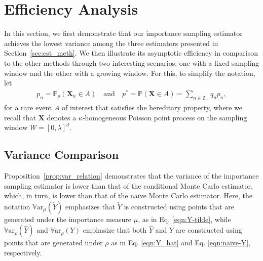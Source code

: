 \documentclass[pdflatex, sn-mathphys-ay]{sn-jnl}%
\newcommand{\intg}{\mathbb{Z}}
\renewcommand{\v}[1]{\boldsymbol{#1}}
\newcommand{\pp}{\mathbb{P}}
\newcommand{\mX}{\v{X}}
\newcommand{\wt}{\widetilde}
\newcommand{\wh}{\widehat}
\newcommand{\var}{\mathbb{V}\mathrm{ar}}
\theoremstyle{thmstyleone}%
\theoremstyle{thmstyletwo}%
\theoremstyle{thmstylethree}%
\begin{document}
\section{Efficiency Analysis}
\label{sec:efficiency}
In this section, we first demonstrate that our importance sampling estimator achieves the lowest variance among the three estimators presented in Section~\ref{sec:est_meth}. We then illustrate its asymptotic efficiency in comparison to the other methods through two interesting scenarios: one with a fixed sampling window and the other with a growing window. For this, to simplify the notation, let 
\begin{align}
    \label{eqn:defn_pn}
    p_n = \pp_\rho(\mX_n \in A)\quad \text{and}\quad  
    p^* = \pp(\mX \in A) = \sum_{n \in \intg_+} q_n p_n,
\end{align}
for a rare event $A$ of interest that satisfies the hereditary property, where we recall that $\mX$ denotes a $\kappa$-homogeneous Poisson point process on the sampling window $W = [0, \lambda]^d$. 
\subsection{Variance Comparison}
\label{sec:non-asymptotic}
Proposition~\ref{prop:var_relation} demonstrates that the variance of the importance sampling estimator is lower than that of the conditional Monte Carlo estimator, which, in turn, is lower than that of the na\"{i}ve Monte Carlo estimator. Here, the notation $\var_\mu(\wt Y)$ emphasizes that $\wt Y$ is constructed using points that are generated under the importance measure $\mu$, as in Eq. \eqref{eqn:Y-tilde},  while $\var_\rho(\wh Y)$ and $\var_\rho(Y)$ emphasize that both $\wh Y$  and $Y$ are constructed using points that are generated under $\rho$ as in Eq. \eqref{eqn:Y_hat} and Eq. \eqref{eqn:naive-Y}, respectively.
\end{document}
